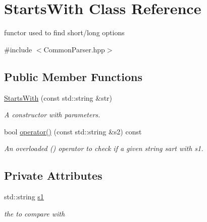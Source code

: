 \hypertarget{classStartsWith}{
\section{StartsWith Class Reference}
\label{classStartsWith}
}


functor used to find short/long options  




{\ttfamily \#include $<$CommonParser.hpp$>$}

\subsection*{Public Member Functions}
\begin{DoxyCompactItemize}
\item 
\hyperlink{classStartsWith_a77da87e1c3df7452d7a594ed0ab95d99}{StartsWith} (const std::string \&str)
\begin{DoxyCompactList}\small\item\em A constructor with parameters. \item\end{DoxyCompactList}\item 
bool \hyperlink{classStartsWith_a4c64e9845fb2f12f0a2e6c934a3da90a}{operator()} (const std::string \&s2) const 
\begin{DoxyCompactList}\small\item\em An overloaded () operator to check if a given string sart with s1. \item\end{DoxyCompactList}\end{DoxyCompactItemize}
\subsection*{Private Attributes}
\begin{DoxyCompactItemize}
\item 
\hypertarget{classStartsWith_a781aa01b213aa7a6ba5864c4853b1a85}{
std::string \hyperlink{classStartsWith_a781aa01b213aa7a6ba5864c4853b1a85}{s1}}
\label{classStartsWith_a781aa01b213aa7a6ba5864c4853b1a85}

\begin{DoxyCompactList}\small\item\em the to compare with \item\end{DoxyCompactList}\end{DoxyCompactItemize}


